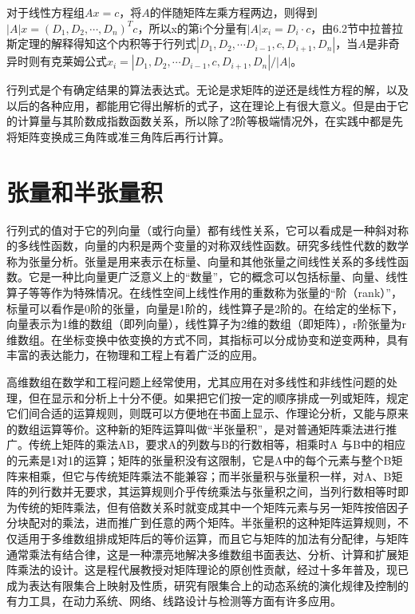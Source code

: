 	对于线性方程组$  Ax = c $，将$ A $的伴随矩阵左乘方程两边，则得到$ |A|x = (D_1, D_2, \cdots,D_n)^Tc $，所以x的第i个分量有$ |A|x_i = D_i\cdot c $，由6.2节中拉普拉斯定理的解释得知这个内积等于行列式$ |D_1, D_2,\cdots D_{i-1},c,D_{i+1},D_n| $，当$ A $是非奇异时则有克莱姆公式$ x_i=|D_1, D_2, \cdots D_{i-1},c,D_{i+1},D_n|/|A| $。
	
	行列式是个有确定结果的算法表达式。无论是求矩阵的逆还是线性方程的解，以及以后的各种应用，都能用它得出解析的式子，这在理论上有很大意义。但是由于它的计算量与其阶数成指数函数关系，所以除了2阶等极端情况外，在实践中都是先将矩阵变换成三角阵或准三角阵后再行计算。
	
	\section{张量和半张量积}
	
	行列式的值对于它的列向量（或行向量）都有线性关系，它可以看成是一种斜对称的多线性函数，向量的内积是两个变量的对称双线性函数。研究多线性代数的数学称为张量分析。张量是用来表示在标量、向量和其他张量之间线性关系的多线性函数。它是一种比向量更广泛意义上的``数量''，它的概念可以包括标量、向量、线性算子等等作为特殊情况。在线性空间上线性作用的重数称为张量的``阶（rank）''，标量可以看作是0阶的张量，向量是1阶的，线性算子是2阶的。在给定的坐标下，向量表示为1维的数组（即列向量），线性算子为2维的数组（即矩阵），r阶张量为r维数组。在坐标变换中依变换的方式不同，其指标可以分成协变和逆变两种，具有丰富的表达能力，在物理和工程上有着广泛的应用。
	
	高维数组在数学和工程问题上经常使用，尤其应用在对多线性和非线性问题的处理，但在显示和分析上十分不便。如果把它们按一定的顺序排成一列或矩阵，规定它们间合适的运算规则，则既可以方便地在书面上显示、作理论分析，又能与原来的数组运算等价。这种新的矩阵运算叫做``半张量积''，是对普通矩阵乘法进行推广。传统上矩阵的乘法AB，要求A的列数与B的行数相等，相乘时A 与B中的相应的元素是1对1的运算；矩阵的张量积没有这限制，它是A中的每个元素与整个B矩阵来相乘，但它与传统矩阵乘法不能兼容；而半张量积与张量积一样，对A、B矩阵的列行数并无要求，其运算规则介乎传统乘法与张量积之间，当列行数相等时即为传统的矩阵乘法，但有倍数关系时就变成其中一个矩阵元素与另一矩阵按倍因子分块配对的乘法，进而推广到任意的两个矩阵。半张量积的这种矩阵运算规则，不仅适用于多维数组排成矩阵后的等价运算，而且它与矩阵的加法有分配律，与矩阵通常乘法有结合律，这是一种漂亮地解决多维数组书面表达、分析、计算和扩展矩阵乘法的设计。这是程代展教授对矩阵理论的原创性贡献，经过十多年普及，现已成为表达有限集合上映射及性质，研究有限集合上的动态系统的演化规律及控制的有力工具，在动力系统、网络、线路设计与检测等方面有许多应用。\\
	
